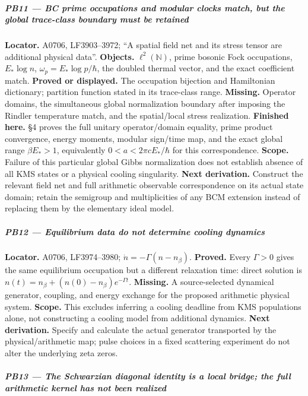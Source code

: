 \subparagraph{PB11 --- BC prime occupations and modular clocks match,
but the global trace-class boundary must be
retained}\label{pb11-bc-prime-occupations-and-modular-clocks-match-but-the-global-trace-class-boundary-must-be-retained}

\textbf{Locator.} A0706, LF3903--3972; ``A spatial field net and its
stress tensor are additional physical data''. \textbf{Objects.}
\(\ell^2(\mathbb N)\), prime bosonic Fock occupations, \(E_*\log n\),
\(\omega_p=E_*\log p/\hbar\), the doubled thermal vector, and the exact
coefficient match. \textbf{Proved or displayed.} The occupation
bijection and Hamiltonian dictionary; partition function stated in its
trace-class range. \textbf{Missing.} Operator domains, the simultaneous
global normalization boundary after imposing the Rindler temperature
match, and the spatial/local stress realization. \textbf{Finished here.}
\protect{} §4 proves the full unitary
operator/domain equality, prime product convergence, energy moments,
modular sign/time map, and the exact global range \(\beta E_*>1\),
equivalently \(0<a<2\pi cE_*/\hbar\) for this correspondence.
\textbf{Scope.} Failure of this particular global Gibbs normalization
does not establish absence of all KMS states or a physical cooling
singularity. \textbf{Next derivation.} Construct the relevant field net
and full arithmetic observable correspondence on its actual state
domain; retain the semigroup and multiplicities of any BCM extension
instead of replacing them by the elementary ideal model.

\subparagraph{PB12 --- Equilibrium data do not determine cooling
dynamics}\label{pb12-equilibrium-data-do-not-determine-cooling-dynamics}

\textbf{Locator.} A0706, LF3974--3980; \(\dot n=-\Gamma(n-n_\beta)\).
\textbf{Proved.} Every \(\Gamma>0\) gives the same equilibrium
occupation but a different relaxation time: direct solution is
\(n(t)=n_\beta+(n(0)-n_\beta)e^{-\Gamma t}\). \textbf{Missing.} A
source-selected dynamical generator, coupling, and energy exchange for
the proposed arithmetic physical system. \textbf{Scope.} This excludes
inferring a cooling deadline from KMS populations alone, not
constructing a cooling model from additional dynamics. \textbf{Next
derivation.} Specify and calculate the actual generator transported by
the physical/arithmetic map; pulse choices in a fixed scattering
experiment do not alter the underlying zeta zeros.

\subparagraph{PB13 --- The Schwarzian diagonal identity is a local
bridge; the full arithmetic kernel has not been
realized}\label{pb13-the-schwarzian-diagonal-identity-is-a-local-bridge-the-full-arithmetic-kernel-has-not-been-realized}

